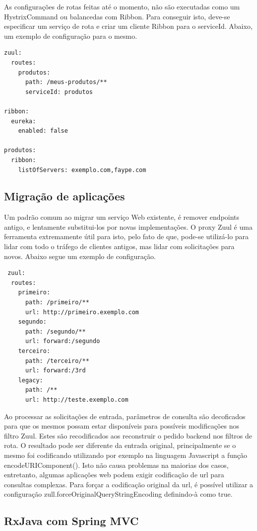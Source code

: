 \documentclass[journal]{IEEEtran}
\begin{document}
As configurações de rotas feitas até o momento, não são executadas como um HystrixCommand ou balancedas com Ribbon. Para conseguir isto, deve-se especificar um serviço de rota e criar um cliente Ribbon para o serviceId. Abaixo, um exemplo de configuração para o mesmo.

\begin{verbatim}
zuul:
  routes:
    produtos:
      path: /meus-produtos/**
      serviceId: produtos

ribbon:
  eureka:
    enabled: false

produtos:
  ribbon:
    listOfServers: exemplo.com,faype.com
\end{verbatim}

\subsection{Migração de aplicações}

Um padrão comum ao migrar um serviço Web existente, é remover endpoints antigo, e lentamente substitui-los por novas implementações. O proxy Zuul é uma ferramenta extremamente útil para isto, pelo fato de que, pode-se utilizá-lo para lidar com todo o tráfego de clientes antigos, mas lidar com solicitações para novos. Abaixo segue um exemplo de configuração.

\begin{verbatim}
 zuul:
  routes:
    primeiro:
      path: /primeiro/**
      url: http://primeiro.exemplo.com
    segundo:
      path: /segundo/**
      url: forward:/segundo
    terceiro:
      path: /terceiro/**
      url: forward:/3rd
    legacy:
      path: /**
      url: http://teste.exemplo.com
\end{verbatim}

Ao processar as solicitações de entrada, parâmetros de consulta são  decoficados para que os mesmos possam estar disponíveis para possíveis modificações nos filtro Zuul. Estes são recodificados aos reconstruir o pedido backend nos filtros de rota. O resultado pode ser diferente da entrada original, principalmente se o mesmo foi codificando utilizando por exemplo na linguagem Javascript a função encodeURIComponent(). Isto não causa problemas na maiorias dos casos, entretanto, algumas aplicações web podem exigir codificação de url para consultas complexas. Para forçar a codificação original da url, é possível utilizar a configuração zull.forceOriginalQueryStringEncoding definindo-à como true.


\subsection{RxJava com Spring MVC}
\end{document}
